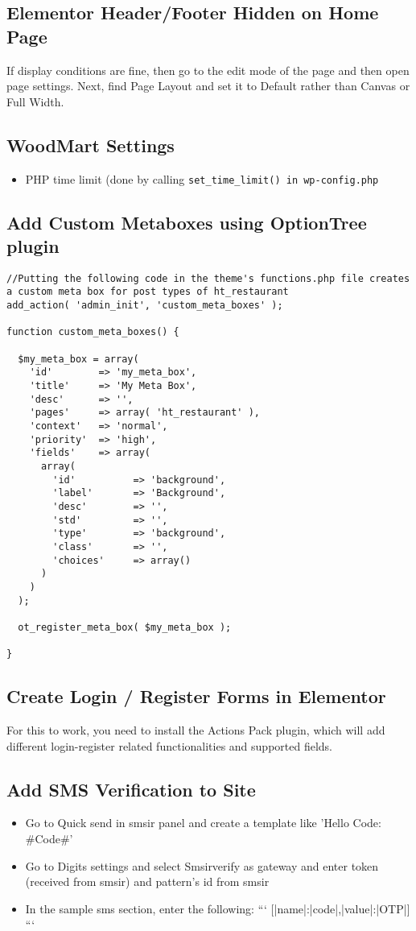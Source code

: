 \documentclass{article}
\begin{document}
\subsection{Elementor Header/Footer Hidden on Home Page}
If display conditions are fine, then go to the edit mode of the page and then open page settings. Next, find Page Layout and set it to Default rather than Canvas or Full Width.
\subsection{WoodMart Settings}
\begin{itemize}
 \item PHP time limit (done by calling \lstinline{set_time_limit() in wp-config.php}
\end{itemize}
\subsection{Add Custom Metaboxes using OptionTree plugin}
\begin{verbatim}
//Putting the following code in the theme's functions.php file creates a custom meta box for post types of ht_restaurant
add_action( 'admin_init', 'custom_meta_boxes' );

function custom_meta_boxes() {

  $my_meta_box = array(
    'id'        => 'my_meta_box',
    'title'     => 'My Meta Box',
    'desc'      => '',
    'pages'     => array( 'ht_restaurant' ),
    'context'   => 'normal',
    'priority'  => 'high',
    'fields'    => array(
      array(
        'id'          => 'background',
        'label'       => 'Background',
        'desc'        => '',
        'std'         => '',
        'type'        => 'background',
        'class'       => '',
        'choices'     => array()
      )
    )
  );
  
  ot_register_meta_box( $my_meta_box );

}
\end{verbatim}
\subsection{Create Login / Register Forms in Elementor}
For this to work, you need to install the Actions Pack plugin, which will add different login-register related functionalities and supported fields. 

\subsection{Add SMS Verification to Site}
\begin{itemize}
  \item Go to Quick send in smsir panel and create a template like 'Hello Code: \#Code\#'
  \item Go to Digits settings and select Smsirverify as gateway and enter token (received from smsir) and pattern's id from smsir
  \item In the sample sms section, enter the following:
  ```
  [{|name|:|code|,|value|:|{OTP}|}]
  ```
\end{itemize}
\end{document}

